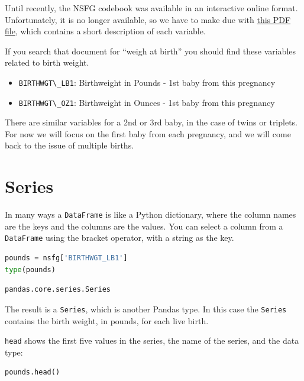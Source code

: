 Until recently, the NSFG codebook was available in an interactive online
format. Unfortunately, it is no longer available, so we have to make due
with
\href{https://github.com/AllenDowney/ElementsOfDataScience/raw/master/data/2015-2017_NSFG_FemPregFile_Codebook-508.pdf}{this
PDF file}, which contains a short description of each variable.

If you search that document for ``weigh at birth'' you should find these
variables related to birth weight.

\begin{itemize}
\item
  \passthrough{\lstinline!BIRTHWGT\_LB1!}: Birthweight in Pounds - 1st
  baby from this pregnancy
\item
  \passthrough{\lstinline!BIRTHWGT\_OZ1!}: Birthweight in Ounces - 1st
  baby from this pregnancy
\end{itemize}

There are similar variables for a 2nd or 3rd baby, in the case of twins
or triplets. For now we will focus on the first baby from each
pregnancy, and we will come back to the issue of multiple births.

\hypertarget{series}{%
\section{Series}\label{series}}

In many ways a \passthrough{\lstinline!DataFrame!} is like a Python
dictionary, where the column names are the keys and the columns are the
values. You can select a column from a
\passthrough{\lstinline!DataFrame!} using the bracket operator, with a
string as the key.

\begin{lstlisting}[language=Python]
pounds = nsfg['BIRTHWGT_LB1']
type(pounds)
\end{lstlisting}

\begin{lstlisting}[]
pandas.core.series.Series
\end{lstlisting}

The result is a \passthrough{\lstinline!Series!}, which is another
Pandas type. In this case the \passthrough{\lstinline!Series!} contains
the birth weight, in pounds, for each live birth.

\passthrough{\lstinline!head!} shows the first five values in the
series, the name of the series, and the data type:

\begin{lstlisting}[language=Python]
pounds.head()
\end{lstlisting}

